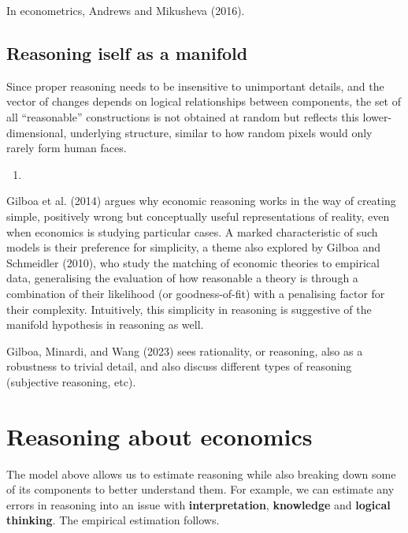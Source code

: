 \documentclass[
]{article}
\providecommand{\tightlist}{%
  \setlength{\itemsep}{0pt}\setlength{\parskip}{0pt}}\usepackage{longtable,booktabs,array}
\begin{document}
In econometrics, Andrews and Mikusheva (2016).

\hypertarget{reasoning-iself-as-a-manifold}{%
\subsection{Reasoning iself as a
manifold}\label{reasoning-iself-as-a-manifold}}

Since proper reasoning needs to be insensitive to unimportant details,
and the vector of changes depends on logical relationships between
components, the set of all ``reasonable'' constructions is not obtained
at random but reflects this lower-dimensional, underlying structure,
similar to how random pixels would only rarely form human faces.

\begin{enumerate}
\def\labelenumi{\arabic{enumi}.}
\tightlist
\item
\end{enumerate}

Gilboa et al. (2014) argues why economic reasoning works in the way of
creating simple, positively wrong but conceptually useful
representations of reality, even when economics is studying particular
cases. A marked characteristic of such models is their preference for
simplicity, a theme also explored by Gilboa and Schmeidler (2010), who
study the matching of economic theories to empirical data, generalising
the evaluation of how reasonable a theory is through a combination of
their likelihood (or goodness-of-fit) with a penalising factor for their
complexity. Intuitively, this simplicity in reasoning is suggestive of
the manifold hypothesis in reasoning as well.

Gilboa, Minardi, and Wang (2023) sees rationality, or reasoning, also as
a robustness to trivial detail, and also discuss different types of
reasoning (subjective reasoning, etc).

\hypertarget{reasoning-about-economics}{%
\section{Reasoning about economics}\label{reasoning-about-economics}}

The model above allows us to estimate reasoning while also breaking down
some of its components to better understand them. For example, we can
estimate any errors in reasoning into an issue with
\textbf{interpretation}, \textbf{knowledge} and \textbf{logical
thinking}. The empirical estimation follows.
\end{document}
